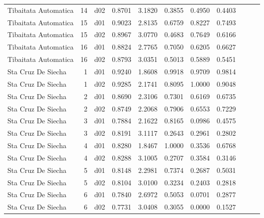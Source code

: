 \begin{landscape}
\begin{longtable}{p{2cm}rrrrrrrrrr}
    Tibaitata Automatica  &         14 &     d02 &   0.8701 &  3.1820 &        0.3855 &           0.4950 &  0.4403 \\
    Tibaitata Automatica  &         15 &     d01 &   0.9023 &  2.8135 &        0.6759 &           0.8227 &  0.7493 \\
    Tibaitata Automatica  &         15 &     d02 &   0.8967 &  3.0770 &        0.4683 &           0.7649 &  0.6166 \\
    Tibaitata Automatica  &         16 &     d01 &   0.8824 &  2.7765 &        0.7050 &           0.6205 &  0.6627 \\
    Tibaitata Automatica  &         16 &     d02 &   0.8793 &  3.0351 &        0.5013 &           0.5889 &  0.5451 \\
      Sta Cruz De Siecha  &          1 &     d01 &   0.9240 &  1.8608 &        0.9918 &           0.9709 &  0.9814 \\
      Sta Cruz De Siecha  &          1 &     d02 &   0.9285 &  2.1741 &        0.8095 &           1.0000 &  0.9048 \\
      Sta Cruz De Siecha  &          2 &     d01 &   0.8690 &  2.3106 &        0.7301 &           0.6169 &  0.6735 \\
      Sta Cruz De Siecha  &          2 &     d02 &   0.8749 &  2.2068 &        0.7906 &           0.6553 &  0.7229 \\
      Sta Cruz De Siecha  &          3 &     d01 &   0.7884 &  2.1622 &        0.8165 &           0.0986 &  0.4575 \\
      Sta Cruz De Siecha  &          3 &     d02 &   0.8191 &  3.1117 &        0.2643 &           0.2961 &  0.2802 \\
      Sta Cruz De Siecha  &          4 &     d01 &   0.8280 &  1.8467 &        1.0000 &           0.3536 &  0.6768 \\
      Sta Cruz De Siecha  &          4 &     d02 &   0.8288 &  3.1005 &        0.2707 &           0.3584 &  0.3146 \\
      Sta Cruz De Siecha  &          5 &     d01 &   0.8148 &  2.2981 &        0.7374 &           0.2687 &  0.5031 \\
      Sta Cruz De Siecha  &          5 &     d02 &   0.8104 &  3.0100 &        0.3234 &           0.2403 &  0.2818 \\
      Sta Cruz De Siecha  &          6 &     d01 &   0.7840 &  2.6972 &        0.5053 &           0.0701 &  0.2877 \\
      Sta Cruz De Siecha  &          6 &     d02 &   0.7731 &  3.0408 &        0.3055 &           0.0000 &  0.1527 \\

\end{longtable}
\end{landscape}
